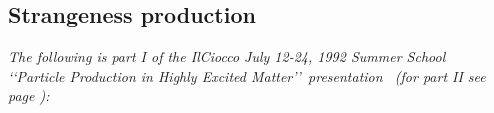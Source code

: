 \subsection[Strangeness production
\hfill\textbf{reprinted sections are not numbered}]{Strangeness production}
%
\noindent\textit{The following is part I of the IlCiocco July 12-24, 1992 Summer School~\cite{Gutbrod:1993rp} \lq\lq Particle Production in Highly Excited Matter\rq\rq\ presentation~\cite{Rafelski:1992td} (for part II see page \pageref{Trail1992p2}):}\\[-0.7cm]
%
